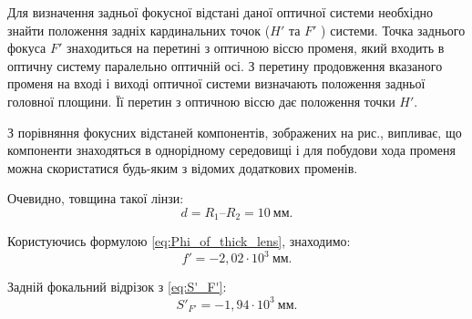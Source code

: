 \begin{solutionexample}

	Для визначення задньої фокусної відстані даної оптичної системи
	необхідно знайти положення задніх кардинальних точок ($H'$ та $F'$ ) системи.
	Точка заднього фокуса $F'$ знаходиться на перетині з оптичною віссю
	променя, який входить в оптичну систему паралельно оптичній осі. З
	перетину продовження вказаного променя на вході і виході оптичної
	системи визначають положення задньої головної площини. Її перетин з
	оптичною віссю дає положення точки $H'$.

	\begin{center}
		
	\end{center}

	З порівняння фокусних відстаней компонентів, зображених на
	рис., випливає, що компоненти знаходяться в однорідному середовищі
	і для побудови хода променя можна скористатися будь-яким з відомих
	додаткових променів.

\end{solutionexample}
\begin{solutionexample}

	Очевидно, товщина такої лінзи:
	\begin{equation*}
		d = R_1 – R_2 = 10 \ \text{мм}.
	\end{equation*}

	Користуючись формулою \eqref{eq:Phi_of_thick_lens}, знаходимо:
	\begin{equation*}
		f'  = -2,02 \cdot 10^3\ \text{мм}.
	\end{equation*}

	Задній фокальний відрізок з \eqref{eq:S'_F'}:
	\begin{equation*}
		S'_{F'} = -1,94 \cdot 10^3 \ \text{мм}.
	\end{equation*}

\end{solutionexample}
